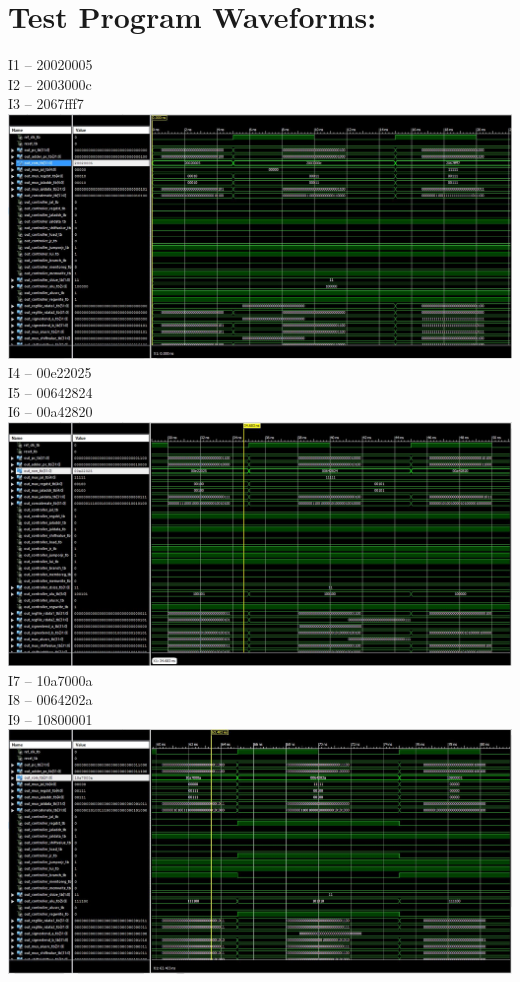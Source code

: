 \documentclass{article}
\begin{document}
	\section{Test Program Waveforms:}
	I1 -- 20020005 \\
	I2 -- 2003000c \\
	I3 -- 2067fff7 \\
  \includegraphics[width=1\columnwidth]{i01.JPG}
	\\
	I4 -- 00e22025 \\
	I5 -- 00642824 \\
	I6 -- 00a42820 \\
  \includegraphics[width=1\columnwidth]{i02.JPG}
	\\
	I7 -- 10a7000a \\
	I8 -- 0064202a \\
	I9 -- 10800001 \\
  \includegraphics[width=1\columnwidth]{i03.JPG}
\end{document}
